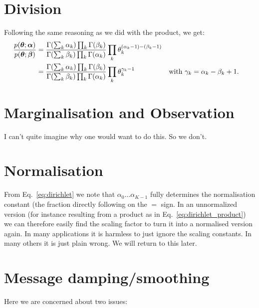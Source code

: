 \documentclass[oneside,english]{scrbook}
\begin{document}
\section{Division}
Following the same reasoning as we did with the product, we get:
\begin{align}
  \frac{p(\bm{\theta}; \bm{\alpha})}{p(\bm{\theta}; \bm{\beta})}
  &= \frac{\Gamma(\sum_k \alpha_k)\prod_{k}\Gamma(\beta_k)}{\Gamma(\sum_k \beta_k)\prod_{k}\Gamma(\alpha_k)}
  \prod_{k}\theta_k^{(\alpha_k-1) - (\beta_k-1)} \notag\\
    &= \frac{\Gamma(\sum_k \alpha_k)\prod_{k}\Gamma(\beta_k)}{\Gamma(\sum_k \beta_k)\prod_{k}\Gamma(\alpha_k)}
  \prod_{k}\theta_k^{\gamma_k-1} && \text{with } \gamma_k = \alpha_k-\beta_k+1.
  \label{eq:dirichlet_division}
\end{align}


\section{Marginalisation and Observation}
I can't quite imagine why one would want to do this. So we don't.

\section{Normalisation}
From Eq.~\ref{eq:dirichlet} we note that $\alpha_{0}\ldots\alpha_{K-1}$
fully determines the normalisation constant (the fraction directly
following on the $=$ sign. In an unnormalized version (for instance
resulting from a product as in Eq.~\ref{eq:dirichlet_product}) we can
therefore easily find the scaling factor to turn it into a normalised
version again. In many applications it is harmless to just ignore the
scaling constants.  In many others it is just plain wrong. We will
return to this later.

\section{Message damping/smoothing}
Here we are concerned about two issues:
\end{document}
